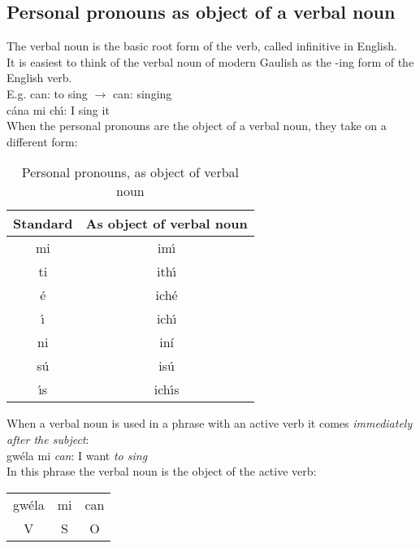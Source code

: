 \subsection{Personal pronouns as object of a verbal noun}

\noindent The verbal noun is the basic root form of the verb, called infinitive in English.\\

\noindent It is easiest to think of the verbal noun of modern Gaulish as the -ing form of the English verb.\\

\noindent E.g. can: to sing $\rightarrow$ can: singing\\
\noindent c\'{a}na mi ch\'{\i}: I sing it\\

\noindent When the personal pronouns are the object of a verbal noun, they take on a different form:
\begin{table}[H]
\centering
\begin{tabu}{c|c}
  \textbf{Standard} & \textbf{As object of verbal noun}\\
  \toprule
  mi & im\'{\i}\\
  ti & ith\'{\i}\\
  \'{e} & ich\'{e}\\
  \'{\i} & ich\'{\i}\\
  ni & in\'{i}\\
  s\'{u} & is\'{u}\\
  \'{\i}s & ich\'{\i}s
\end{tabu}
\caption{Personal pronouns, as object of verbal noun}
\label{personal_pronouns_as_object_of_verbal_noun}
\end{table}

\noindent When a verbal noun is used in a phrase with an active verb it comes \textit{immediately after the subject}:\\

\noindent gw\'{e}la mi \textit{can}: I want \textit{to sing}\\

\noindent In this phrase the verbal noun is the object of the active verb:
\begin{table}[H]
\begin{tabu}{ccc}
  gw\'{e}la & mi & can\\
  V & S & O
\end{tabu}
\label{verbal_noun_object_of_active_verb}
\end{table}

